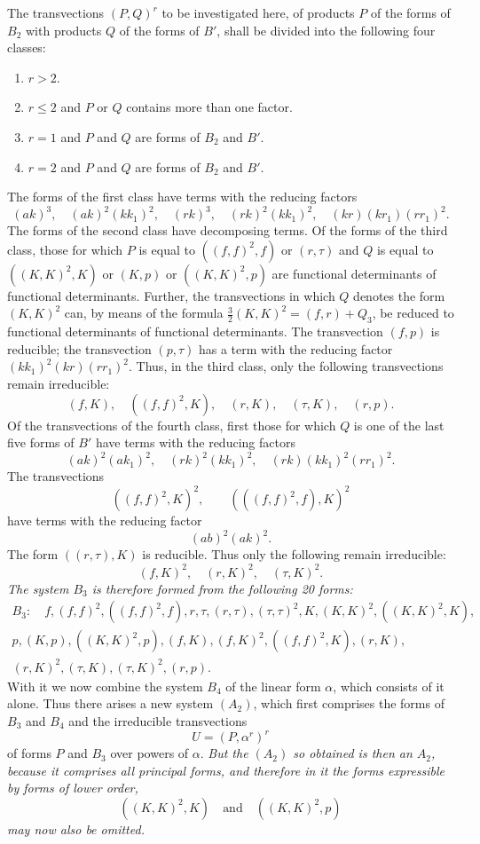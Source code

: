 \documentclass[10pt]{article}
\begin{document}
The transvections $(P,Q)^r$ to be investigated here, of products $P$ of the forms of $B_2$ with products $Q$ of the forms of $B'$, shall be divided into the following four classes:
\begin{enumerate}
\item[I.] $r>2$.
\item[II.] $r\leq2$ and $P$ or $Q$ contains more than one factor.
\item[III.] $r=1$ and $P$ and $Q$ are forms of $B_2$ and $B'$.
\item[IV.] $r=2$ and $P$ and $Q$ are forms of $B_2$ and $B'$.
\end{enumerate}
The forms of the first class have terms with the reducing factors
\[
(ak)^3,
\quad (ak)^2(kk_1)^2,
\quad (rk)^3,
\quad (rk)^2(kk_1)^2,
\quad (kr)(kr_1)(rr_1)^2.
\]
The forms of the second class have decomposing terms. Of the forms of the third class, those for which $P$ is equal to $((f,f)^2,f)$ or $(r,\tau)$ and $Q$ is equal to $((K,K)^2,K)$ or $(K,p)$ or $((K,K)^2,p)$ are functional determinants of functional determinants. Further, the transvections in which $Q$ denotes the form $(K,K)^2$ can, by means of the formula $\frac32(K,K)^2=(f,r)+Q_3$, be reduced to functional determinants of functional determinants. The transvection $(f,p)$ is reducible; the transvection $(p,\tau)$ has a term with the reducing factor $(kk_1)^2(kr)(rr_1)^2$. Thus, in the third class, only the following transvections remain irreducible:
\[
(f,K),
\quad ((f,f)^2,K),
\quad (r,K),
\quad (\tau,K),
\quad (r,p).
\]
Of the transvections of the fourth class, first those for which $Q$ is one of the last five forms of $B'$ have terms with the reducing factors
\[
(ak)^2(ak_1)^2,
\quad (rk)^2(kk_1)^2,
\quad (rk)(kk_1)^2(rr_1)^2.
\]
The transvections
\[
((f,f)^2,K)^2,
\qquad (((f,f)^2,f),K)^2
\]
have terms with the reducing factor
\[
(ab)^2(ak)^2.
\]
The form $((r,\tau),K)$ is reducible. Thus only the following remain irreducible:
\[
(f,K)^2,
\quad (r,K)^2,
\quad (\tau,K)^2.
\]
\textit{The system $B_3$ is therefore formed from the following 20 forms:}
\[
\begin{gathered}
B_3:
\quad f,(f,f)^2,((f,f)^2,f),r,\tau,(r,\tau),(\tau,\tau)^2,K,(K,K)^2,((K,K)^2,K),\\
p,(K,p),((K,K)^2,p),(f,K),(f,K)^2,((f,f)^2,K),(r,K),\\
(r,K)^2,(\tau,K),(\tau,K)^2,(r,p).
\end{gathered}
\]
With it we now combine the system $B_4$ of the linear form $\alpha$, which consists of it alone. Thus there arises a new system $(A_2)$, which first comprises the forms of $B_3$ and $B_4$ and the irreducible transvections
\[
U=(P,\alpha^r)^r
\]
of forms $P$ and $B_3$ over powers of $\alpha$. \textit{But the $(A_2)$ so obtained is then an $A_2$, because it comprises all principal forms, and therefore in it the forms expressible by forms of lower order,}
\[
((K,K)^2,K)
\quad\text{and}\quad
((K,K)^2,p)
\]
\textit{may now also be omitted.}
\end{document}
